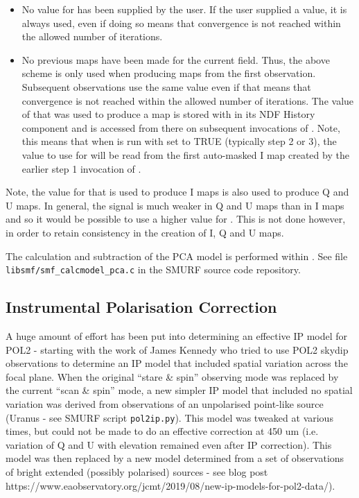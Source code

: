 \documentclass[twoside,11pt]{starlink}
\begin{document}
\begin{itemize}
\item No value for  has been supplied by the user. If
the user supplied a value, it is always used, even if doing so means that
convergence is not reached within the allowed number of iterations.
\item No previous maps have been made for the current field. Thus, the
above scheme is only used when producing maps from the first observation.
Subsequent observations use the same value even if that means that
convergence is not reached within the allowed number of iterations. The
value of  that was used to produce a map is stored with
in its NDF History component and is accessed from there on subsequent
invocations of \ptmap. Note, this means that when \ptmap is run with
 set to TRUE (typically step 2 or 3), the value to use for
 will be read from the first auto-masked I map created
by the earlier step 1 invocation of \ptmap.
\end{itemize}

Note, the value for  that is used to produce I maps is
also used to produce Q and U maps. In general, the signal is much weaker
in Q and U maps than in I maps and so it would be possible to use a
higher value for . This is not done however, in order
to retain consistency in the creation of I, Q and U maps.

The calculation and subtraction of the PCA model is performed within \mmap.
See file \texttt{libsmf/smf\_calcmodel\_pca.c} in the SMURF source code
repository.

\subsection{Instrumental Polarisation Correction}

A huge amount of effort has been put into determining an effective IP
model for POL2 - starting with the work of James Kennedy who tried to use
POL2 skydip observations to determine an IP model that included spatial
variation across the focal plane. When the original ``stare \& spin''
observing mode was replaced by the current ``scan \& spin'' mode, a new
simpler IP model that included no spatial variation was derived from
observations of an unpolarised point-like source (Uranus - see SMURF script
\texttt{pol2ip.py}). This model was tweaked at various times, but could
not be made to do an effective correction at 450 um (i.e. variation of Q
and U with elevation remained even after IP correction). This model was
then replaced by a new model determined from a set of observations of
bright extended (possibly polarised) sources - see blog post
https://www.eaobservatory.org/jcmt/2019/08/new-ip-models-for-pol2-data/).
\end{document}
